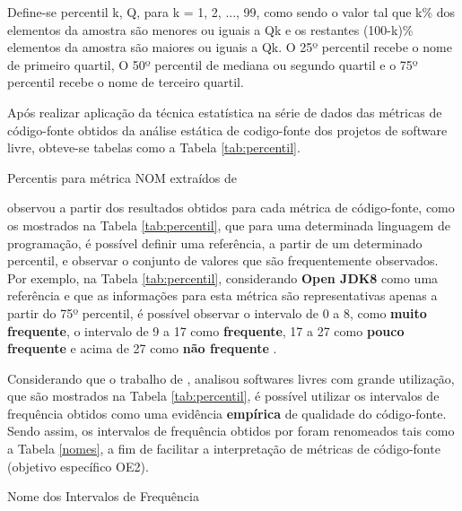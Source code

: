 Define-se percentil k, Q, para k = 1, 2, ..., 99, como sendo o valor tal que k\% dos elementos da amostra são menores ou iguais a Qk e os restantes (100-k)\% elementos da amostra são maiores ou iguais a Qk. O 25º percentil  recebe o nome de primeiro quartil, O 50º percentil de mediana ou segundo quartil e o 75º percentil recebe o nome de terceiro quartil.

Após realizar aplicação da técnica estatística na série de dados das métricas de código-fonte obtidos da análise estática de codigo-fonte dos projetos de software livre, obteve-se tabelas como a Tabela \ref{tab:percentil}.


	\begin{table}[!ht]
	\begin{center}
	
	 
	\caption{Percentis para métrica NOM extraídos de  
	}
	\label{tab:percentil}
	\end{center}
	\end{table}	
	\FloatBarrier	



 observou a partir dos resultados obtidos para cada métrica de código-fonte, como os mostrados na Tabela \ref{tab:percentil}, que para uma determinada linguagem de programação, é possível definir uma referência, a partir de um determinado percentil, e observar o conjunto de valores que são frequentemente observados. Por exemplo, na Tabela \ref{tab:percentil}, considerando \textbf{Open JDK8} como uma referência e que as informações para esta métrica são representativas apenas a partir do 75º percentil, é possível observar o intervalo de 0 a 8, como \textbf{muito frequente}, o intervalo de 9 a 17 como \textbf{frequente}, 17 a 27 como \textbf{pouco frequente} e acima de 27 como \textbf{não frequente} \cite{Meirelles2013}.  


Considerando que o trabalho de , analisou softwares livres com grande utilização, que são mostrados na Tabela \ref{tab:percentil}, é possível utilizar os intervalos de frequência obtidos como uma evidência \textbf{empírica} de qualidade do código-fonte. Sendo assim, os intervalos de frequência obtidos por  foram renomeados tais como a Tabela \ref{nomes}, a fim de facilitar a interpretação de métricas de código-fonte (objetivo específico OE2). 

	\begin{table}[!ht]
	\begin{center}
	
	\caption{Nome dos Intervalos de Frequência}
	\label{nomes}
	\end{center}
	\end{table}
		
